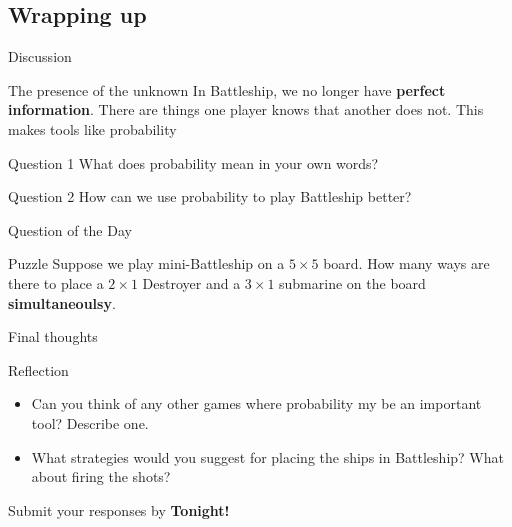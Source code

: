 \documentclass{beamer}
\begin{document}
\subsection{Wrapping up}

\begin{frame}{Discussion}
\pause
  \begin{block}{The presence of the unknown}
	In Battleship, we no longer have \textbf{perfect information}.  There are
    things one player knows that another does not.  This makes tools like probability 
  \end{block}
\pause
  \begin{block}{Question 1}
    What does probability mean in your own words?
  \end{block}
\pause
  \begin{block}{Question 2}
    How can we use probability to play Battleship better?
  \end{block}
\end{frame}


\begin{frame}{Question of the Day}
\pause
  \begin{block}{Puzzle}
    Suppose we play mini-Battleship on a $5\times 5$ board.
    How many ways are there to place a $2\times 1$ Destroyer and a $3\times 1$ submarine on the board \textbf{simultaneoulsy}.
  \end{block}
\end{frame}

\begin{frame}{Final thoughts}
  \begin{block}{Reflection}
    \begin{itemize}
\pause
      \item Can you think of any other games where probability my be an important tool?  Describe one.
\pause
      \item What strategies would you suggest for placing the ships in Battleship?  What about firing the shots?
    \end{itemize}
  \end{block}
\begin{center}
Submit your responses by \textbf{Tonight!}
\end{center}
\end{frame}
\end{document}
